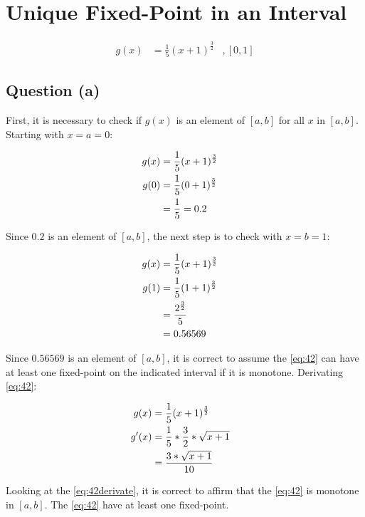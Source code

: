 \section{Unique Fixed-Point in an Interval}
	
	\begin{align}
		g(x) &= \frac{1}{5}(x+1)^{\frac{3}{2}}&,[0,1]
	\label{eq:42}
	\end{align}

	\subsection{Question (a)}

		First, it is necessary to check if $g(x)$ is an element of $[a,b]$ for all $x$ in $[a,b]$. Starting with $x = a = 0$:
		
		\begin{align}
			g(x) &= \frac{1}{5}(x+1)^{\frac{3}{2}}& \notag \\
			g(0) &= \frac{1}{5}(0+1)^{\frac{3}{2}}& \notag \\
			&= \frac{1}{5} = 0.2&
		\label{eq:42a0x}
		\end{align}

		Since $0.2$ is an element of $[a,b]$, the next step is to check with $x = b = 1$:

		\begin{align}
			g(x) &= \frac{1}{5}(x+1)^{\frac{3}{2}}& \notag \\
			g(1) &= \frac{1}{5}(1+1)^{\frac{3}{2}}& \notag \\
			&= \frac{2^{\frac{3}{2}}}{5}& \notag \\
			&= 0.56569&
		\label{eq:42a1x}
		\end{align}

		Since $0.56569$ is an element of $[a,b]$, it is correct to assume the \cref{eq:42} can have at least one fixed-point on the indicated interval if it is monotone. Derivating \cref{eq:42}:

		\begin{align}
			g(x) &= \frac{1}{5}(x+1)^{\frac{3}{2}}& \notag \\
			g'(x) &= \frac{1}{5}*\frac{3}{2}*\sqrt{x+1}& \notag \\
			&= \frac{3*\sqrt{x+1}}{10}&
		\label{eq:42derivate}
		\end{align}

		Looking at the \cref{eq:42derivate}, it is correct to affirm that the \cref{eq:42} is monotone in $[a,b]$. The \cref{eq:42} have at least one fixed-point.

